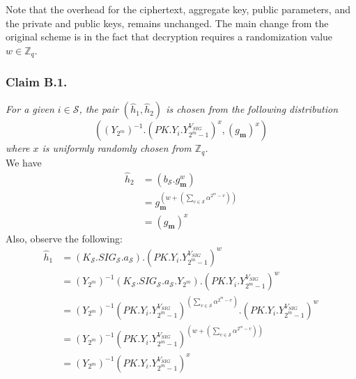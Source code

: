 \noindent Note that the overhead for the ciphertext, aggregate key, public parameters, and the private and public keys, remains unchanged. The main change from the original scheme is in the fact that decryption requires a randomization value $w\in\mathbb{Z}_q$.

\subsubsection{Claim B.1.} \textit{For a given $i\in\mathcal{S}$, the pair $(\hat{h}_1,\hat{h}_2)$ is chosen from the following distribution 
\begin{equation}
\left(\left({Y_{2^m}}\right)^{-1}.\left(PK.Y_i.Y^{V_{SIG}}_{2^m-1}\right)^x,\left(g_{\mathbf{m}}\right)^x\right)\nonumber
\end{equation}
\noindent where $x$ is uniformly randomly chosen from $\mathbb{Z}_q$.}\\

 We have 
\begin{equation}
\begin{split}
 \hat{h}_2 &= \left(b_{\mathcal{S}}.g^w_{\mathbf{m}}\right)\\
 &= g^{\left(w+\left(\sum_{v\in\mathcal{S}}\alpha^{2^m-v}\right)\right)}_{\mathbf{m}}\\
 &= \left(g_{\mathbf{m}}\right)^x\nonumber
\end{split}
\end{equation}
\noindent Also, observe the following:
\begin{equation}
\begin{split}
 \hat{h}_1 &= \left(K_{\mathcal{S}}.SIG_{\mathcal{S}}.a_{\mathcal{S}}\right).\left(PK.Y_i.Y^{V_{SIG}}_{2^m-1}\right)^w\\
 &= \left({Y_{2^m}}\right)^{-1}\left(K_{\mathcal{S}}.SIG_{\mathcal{S}}.a_{\mathcal{S}}.{Y_{2^m}}\right).\left(PK.Y_i.Y^{V_{SIG}}_{2^m-1}\right)^w\\
 &= \left({Y_{2^m}}\right)^{-1}\left(PK.Y_i.Y^{V_{SIG}}_{2^m-1}\right)^{\left(\sum_{v\in\mathcal{S}}\alpha^{2^m-v}\right)}.\left(PK.Y_i.Y^{V_{SIG}}_{2^m-1}\right)^w\\
 &= \left({Y_{2^m}}\right)^{-1}\left(PK.Y_i.Y^{V_{SIG}}_{2^m-1}\right)^{(w+\left(\sum_{v\in\mathcal{S}}\alpha^{2^m-v}\right))}\\
 &= \left({Y_{2^m}}\right)^{-1}\left(PK.Y_i.Y^{V_{SIG}}_{2^m-1}\right)^x\nonumber
\end{split} 
\end{equation}


